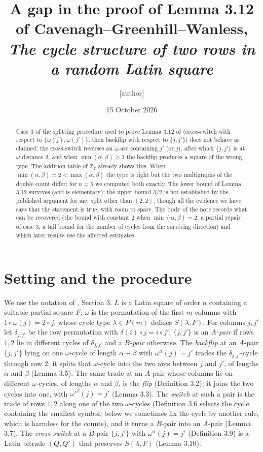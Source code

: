 \documentclass[11pt]{article}
\title{A gap in the proof of Lemma 3.12 of Cavenagh--Greenhill--Wanless, \\
\emph{The cycle structure of two rows in a random Latin square}}
\author{[author]}
\date{15 October 2026}
\theoremstyle{remark}
\begin{document}
\maketitle

\begin{abstract}
Case 3 of the splitting procedure used to prove Lemma 3.12 of
\cite{CGW08} (cross-switch with respect to $\{\omega(j),\omega(j')\}$,
then backflip with respect to $\{j,j'\}$) does not behave as claimed:
the cross-switch reverses an $\omega$-arc containing $j'$ (or $j$),
after which $\{j,j'\}$ is at $\omega$-distance $2$, and when
$\min(\alpha,\beta)\ge3$ the backflip produces a square of the wrong
type.  The addition table of $\mathbb Z_7$ already shows this.  When
$\min(\alpha,\beta)=2<\max(\alpha,\beta)$ the type is right but the
two multigraphs of the double count differ; for $n=5$ we computed both
exactly.  The lower bound of Lemma 3.12 survives (and is elementary);
the upper bound $3/2$ is not established by the published argument for
any split other than $(2,2)$, though all the evidence we have says
that the statement is true, with room to spare.  The body of the note
records what can be recovered (the bound with constant $2$ when
$\min(\alpha,\beta)=2$; a partial repair of case 3; a tail bound for
the number of cycles from the surviving direction) and which later
results use the affected estimates.
\end{abstract}

\section{Setting and the procedure}

We use the notation of \cite{CGW08}, Section 3.  $L$ is a Latin square
of order $n$ containing a suitable partial square $F$; $\omega$ is the
permutation of the first $m$ columns with $1\circ\omega(j)=2\circ j$,
whose cycle type $\lambda\in P(m)$ defines $S(\lambda,F)$.  For
columns $j,j'$ let $\delta_{j,j'}$ be the row permutation with
$\delta(i)\circ j=i\circ j'$; $\{j,j'\}$ is an \emph{$A$-pair} if rows
$1,2$ lie in different cycles of $\delta_{j,j'}$ and a \emph{$B$-pair}
otherwise.  The \emph{backflip} at an $A$-pair $\{j,j'\}$ lying on one
$\omega$-cycle of length $\alpha+\beta$ with $\omega^\alpha(j)=j'$
trades the $\delta_{j,j'}$-cycle through row $2$; it splits that
$\omega$-cycle into the two arcs between $j$ and $j'$, of lengths
$\alpha$ and $\beta$ (Lemma 3.5).  The same trade at an $A$-pair
whose columns lie on different $\omega$-cycles, of lengths $\alpha$ and
$\beta$, is the \emph{flip} (Definition 3.2); it joins the two cycles
into one, with $\omega'^{\beta}(j)=j'$ (Lemma 3.3).  The \emph{switch}
at such a pair is the trade of rows $1,2$ along one of the two
$\omega$-cycles (Definition 3.6 selects the cycle containing the
smallest symbol; below we sometimes fix the cycle by another rule,
which is harmless for the counts), and it turns a $B$-pair into an
$A$-pair (Lemma 3.7).  The \emph{cross-switch} at a
$B$-pair $\{j,j'\}$ with $\omega^\alpha(j)=j'$ (Definition 3.9) is a
Latin bitrade $(Q,Q')$ that preserves $S(\lambda,F)$ (Lemma 3.10).
\end{document}
